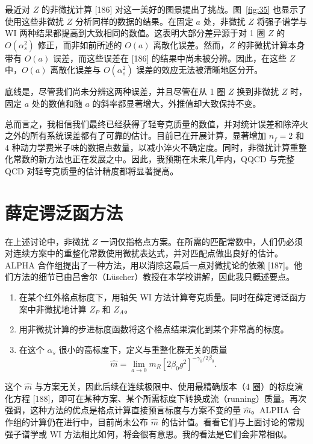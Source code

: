 最近对 $Z$ 的非微扰计算 [186] 对这一美好的图景提出了挑战。图~\ref{fig:35} 也显示了使用这些非微扰 $Z$ 分析同样的数据的结果。在固定 $a$ 处，非微扰 $Z$ 将强子谱学与 WI 两种结果都提高到大致相同的数值。这表明大部分差异源于对 1 圈 $Z$ 的 $O(\alpha_s^2)$ 修正，而非如前所述的 $O(a)$ 离散化误差。然而，$Z$ 的非微扰计算本身带有 $O(a)$ 误差，而这些误差在 [186] 的结果中尚未被分辨。因此，在这些 $Z$ 中，$O(a)$ 离散化误差与 $O(\alpha_s^2)$ 误差的效应无法被清晰地区分开。

底线是，尽管我们尚未分辨这两种误差，并且尽管在从 1 圈 $Z$ 换到非微扰 $Z$ 时，固定 $a$ 处的数值和随 $a$ 的斜率都显著增大，外推值却大致保持不变。

总而言之，我相信我们最终已经获得了轻夸克质量的数值，并对统计误差和除淬火之外的所有系统误差都有了可靠的估计。目前已在开展计算，显著增加 $n_f = 2$ 和 4 种动力学费米子味的数据点数量，以减小淬火不确定度。同时，非微扰计算重整化常数的新方法也正在发展之中。因此，我预期在未来几年内，QQCD 与完整 QCD 对轻夸克质量的估计精度都将显著提高。

\section{薛定谔泛函方法}

在上述讨论中，非微扰 $Z$ 一词仅指格点方案。在所需的匹配常数中，人们仍必须对连续方案中的重整化常数使用微扰表达式，并对匹配点做出良好的估计。ALPHA 合作组提出了一种方法，用以消除这最后一点对微扰论的依赖 [187]。他们方法的细节已由吕舍尔（Lüscher）教授在本学校讲解，因此我只概述要点。
\begin{enumerate}
\item[(i)] 在某个红外格点标度下，用轴矢 WI 方法计算夸克质量。同时在薛定谔泛函方案中非微扰地计算 $Z_P$ 和 $Z_A$。
\item[(ii)] 用非微扰计算的步进标度函数将这个格点结果演化到某个非常高的标度。
\item[(iii)] 在这个 $\alpha_s$ 很小的高标度下，定义与重整化群无关的质量
\begin{equation}
\hat{m} = \lim_{a\to 0} m_R \left[2\beta_0 g^2\right]^{-\gamma_0/2\beta_0}.
\end{equation}
\end{enumerate}
这个 $\hat{m}$ 与方案无关，因此后续在连续极限中、使用最精确版本（4 圈）的标度演化方程 [188]，即可在某种方案、某个所需标度下转换成流（running）质量。再次强调，这种方法的优点是格点计算直接预言标度与方案不变的量 $\hat{m}$。ALPHA 合作组的计算仍在进行中，目前尚未公布 $\hat{m}$ 的估计值。看看它们与上面讨论的常规强子谱学或 WI 方法相比如何，将会很有意思。我的看法是它们会非常相似。

